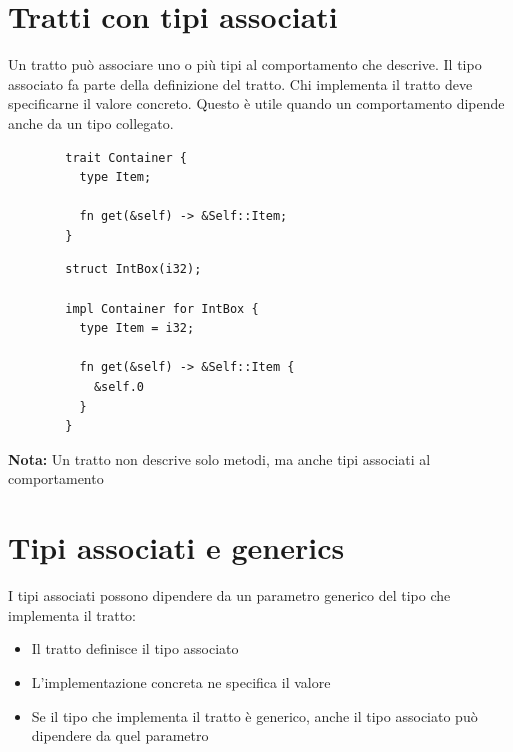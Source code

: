 \section{Tratti con tipi associati}

Un tratto può associare uno o più tipi al comportamento che descrive.
Il tipo associato fa parte della definizione del tratto. Chi implementa il
tratto deve specificarne il valore concreto.
Questo è utile quando un comportamento dipende anche da un tipo collegato.

\begin{center}
  \begin{minipage}{0.47\linewidth}
    \begin{verbatim}
        trait Container {
          type Item;
        
          fn get(&self) -> &Self::Item;
        }
    \end{verbatim}

  \end{minipage}
  \hfill
  \begin{minipage}{0.47\linewidth}
    \begin{verbatim}
        struct IntBox(i32);
        
        impl Container for IntBox {
          type Item = i32;
        
          fn get(&self) -> &Self::Item {
            &self.0
          }
        }
    \end{verbatim}
  \end{minipage}
\end{center}

\begin{tcolorbox}
  \textbf{Nota:} Un tratto non descrive solo metodi, ma anche tipi associati
  al comportamento
\end{tcolorbox}

\section{Tipi associati e generics}
I tipi associati possono dipendere da un parametro generico del tipo che
implementa il tratto:

\begin{itemize}
  \item Il tratto definisce il tipo associato
  \item L'implementazione concreta ne specifica il valore
  \item Se il tipo che implementa il tratto è generico, anche il tipo associato può dipendere da quel parametro
\end{itemize}

